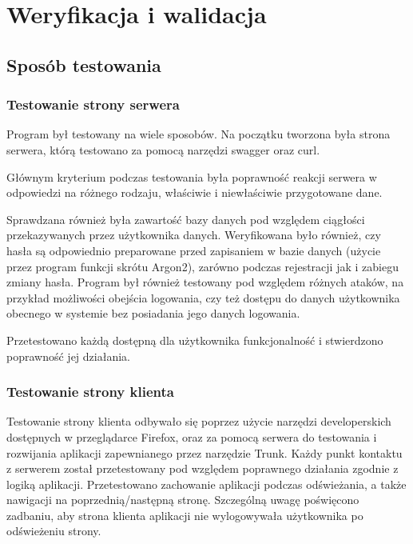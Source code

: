 \documentclass[a4paper,twoside,12pt]{book}
\begin{document}
%      




\chapter{Weryfikacja i walidacja}
\label{ch:06}

\section{Sposób testowania}
\subsection{Testowanie strony serwera}
Program był testowany na wiele sposobów. Na początku tworzona była strona serwera,
którą testowano za pomocą narzędzi swagger oraz curl. 

Głównym kryterium podczas testowania była poprawność reakcji serwera w odpowiedzi
na różnego rodzaju, właściwie i niewłaściwie przygotowane dane. 

Sprawdzana również była zawartość bazy danych pod względem ciągłości przekazywanych
przez użytkownika danych. Weryfikowana było również, czy hasła są odpowiednio preparowane
przed zapisaniem w bazie danych (użycie przez program funkcji skrótu Argon2), zarówno
podczas rejestracji jak i zabiegu zmiany hasła. Program był również testowany pod względem
różnych ataków, na przykład możliwości obejścia logowania, czy też dostępu do danych użytkownika
obecnego w systemie bez posiadania jego danych logowania.

Przetestowano każdą dostępną dla użytkownika funkcjonalność 
i stwierdzono poprawność jej działania.

\subsection{Testowanie strony klienta}

Testowanie strony klienta odbywało się poprzez użycie narzędzi developerskich dostępnych
w przeglądarce Firefox, oraz za pomocą serwera do testowania i rozwijania aplikacji
zapewnianego przez narzędzie Trunk. Każdy punkt kontaktu z serwerem został przetestowany
pod względem poprawnego działania zgodnie z logiką aplikacji. Przetestowano zachowanie
aplikacji podczas odświeżania, a także nawigacji na poprzednią/następną stronę.
Szczególną uwagę poświęcono zadbaniu, aby strona klienta aplikacji nie wylogowywała 
użytkownika po odświeżeniu strony.
\end{document}
